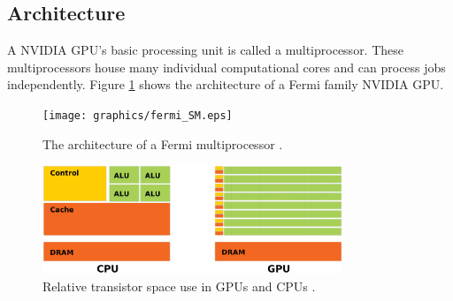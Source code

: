 \subsection{Architecture}

A NVIDIA GPU's basic processing unit is called a multiprocessor.  These multiprocessors house many individual computational cores and can process jobs independently.  Figure \ref{fermi_SM} shows the architecture of a Fermi family NVIDIA GPU.  

\begin{figure}[h!] 
  \centering
    \texttt{[image: graphics/fermi\_SM.eps]}
     \caption{The architecture of a Fermi multiprocessor \cite{cuda}. \label{fermi_SM}}
\end{figure}


\begin{figure}[h!] 
  \centering
    \includegraphics[width=0.8\textwidth]{graphics/CUDA_transistors.eps}
     \caption{Relative transistor space use in GPUs and CPUs \cite{cuda}. \label{cuda_transistors}}
\end{figure}

